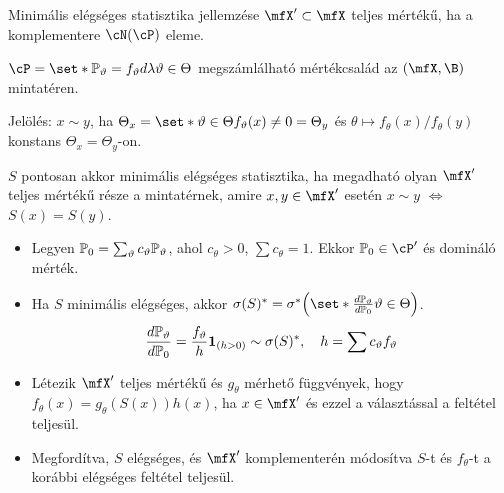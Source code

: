 \documentclass[aspectratio=169,notheorems,9pt,\option]{beamer}
\begin{document}
\begin{frame}{Minimális elégséges statisztika jellemzése}
  $\mfX'\subset\mfX$ teljes mértékű, ha a komplementere $\cN(\cP)$ eleme.
  \begin{proposition}
    $\cP=\set*{\P[\theta]=f_\theta d\lambda}{\theta\in\Theta}$ megszámlálható
    mértékcsalád az $(\mfX,\B)$ mintatéren.
      
    Jelölés: $x\sim y$, ha $\Theta_x=\set*{\theta\in\Theta}{f_\theta(x)\neq0}=\Theta_y$ és 
    $\theta\mapsto f_\theta(x)/f_{\theta}(y)$ konstans $\Theta_x=\Theta_y$-on.

    $S$ pontosan akkor minimális elégséges statisztika, ha megadható olyan $\mfX'$ teljes mértékű része a mintatérnek, 
    amire $x,y\in\mfX'$ esetén $x\sim y$ $\iff$ $S(x)=S(y)$.
  \end{proposition}
  \begin{itemize}
    \item Legyen $\P[0]=\sum_{\theta} c_\theta\P[\theta]$, ahol $c_\theta>0$, $\sum c_\theta=1$. 
      Ekkor $\P[0]\in\cP'$ és domináló mérték.
    \item Ha $S$ minimális elégséges, akkor 
    $\sigma(S)^*=\sigma^*\zjel*{\set*{\frac{d\P[\theta]}{d\P[0]}}{\theta\in\Theta}}$.
    \begin{displaymath}
      \frac{d\P[\theta]}{d\P[0]}=\frac{f_{\theta}}{h}\I{h>0}\sim\sigma(S)^*,\quad h=\sum c_\theta f_\theta
    \end{displaymath}
    \item Létezik $\mfX'$ teljes mértékű és $g_\theta$ mérhető függvények, hogy 
    $f_\theta(x)=g_\theta(S(x))h(x)$, ha $x\in\mfX'$ 
    és ezzel a választással a feltétel teljesül.
    \item Megfordítva, $S$ elégséges, és $\mfX'$ komplementerén módosítva $S$-t és $f_\theta$-t 
    a korábbi elégséges feltétel teljesül. 
  \end{itemize}
\end{frame}
\end{document}
